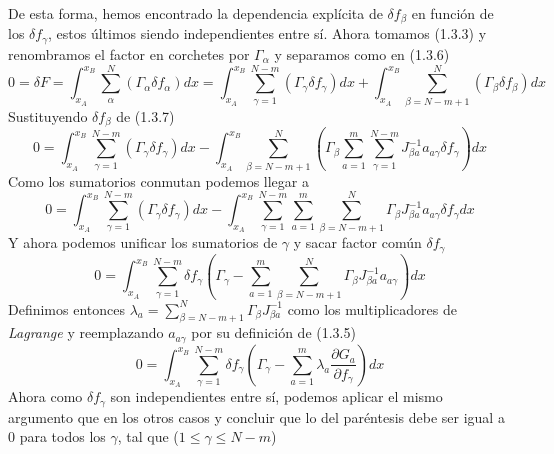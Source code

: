 De esta forma, hemos encontrado la dependencia explícita de $\delta f_\beta$ en función de los $\delta f_\gamma$, estos últimos siendo independientes entre sí. Ahora tomamos (1.3.3) y renombramos el factor en corchetes por $\Gamma_\alpha$ y separamos como en (1.3.6)
\begin{equation} \label{1.3.8}
    0 = \delta F = \int_{x_A}^{x_B}{\sum_\alpha^N{(\Gamma_\alpha \delta f_\alpha)}dx=\int_{x_A}^{x_B}{\sum_{\gamma =1}^{N-m}{(\Gamma_\gamma \delta f_\gamma)}dx+\int_{x_A}^{x_B}{\sum_{\beta=N-m+1}^{N}{(\Gamma_\beta \delta f_\beta)}dx}}}
\end{equation} 
Sustituyendo $\delta f_\beta$ de (1.3.7)
\begin{equation} \label{1.3.9}
    0 =\int_{x_A}^{x_B}{\sum_{\gamma =1}^{N-m}{(\Gamma_\gamma \delta f_\gamma)}dx-\int_{x_A}^{x_B}{\sum_{\beta=N-m+1}^{N}{\left(\Gamma_\beta \sum_{a=1}^m{\sum_{\gamma =1}^{N-m}{J^{-1}_{\beta a}a_{a\gamma}\delta f_\gamma}}\right)}dx}}
\end{equation} 
Como los sumatorios conmutan podemos llegar a
\begin{equation} \label{1.3.10}
    0  =\int_{x_A}^{x_B}{\sum_{\gamma =1}^{N-m}{(\Gamma_\gamma \delta f_\gamma)}dx-\int_{x_A}^{x_B}\sum_{\gamma =1}^{N-m}{{\sum_{a=1}^m{\sum_{\beta=N-m+1}^{N}{\Gamma_\beta J^{-1}_{\beta a}a_{a\gamma}\delta f_\gamma}}}dx}}
\end{equation}  
Y ahora podemos unificar los sumatorios de $\gamma$ y sacar factor común $\delta f_\gamma$
\begin{equation} \label{1.3.11}
    0  =\int_{x_A}^{x_B}{\sum_{\gamma =1}^{N-m}{\delta f_\gamma \left(\Gamma_\gamma -{\sum_{a=1}^m{\sum_{\beta=N-m+1}^{N}{\Gamma_\beta J^{-1}_{\beta a}a_{a\gamma}}}}\right)} dx}
\end{equation}  
Definimos entonces $\lambda_a=\sum_{\beta=N-m+1}^{N}{\Gamma_\beta J^{-1}_{\beta a}}$ como los multiplicadores de \textit{Lagrange} y reemplazando $a_{a\gamma}$ por su definición de (1.3.5)
\begin{equation} \label{1.3.12}
    0  =\int_{x_A}^{x_B}{\sum_{\gamma =1}^{N-m}{\delta f_\gamma \left(\Gamma_\gamma -{\sum_{a=1}^m{\lambda_a \frac{\partial G_a}{\partial f_\gamma}}}\right)} dx}
\end{equation} 
Ahora como $\delta f_\gamma$ son independientes entre sí, podemos aplicar el mismo argumento que en los otros casos y concluir que lo del paréntesis debe ser igual a 0 para todos los $\gamma$, tal que ($1 \leq \gamma \leq N-m$)
